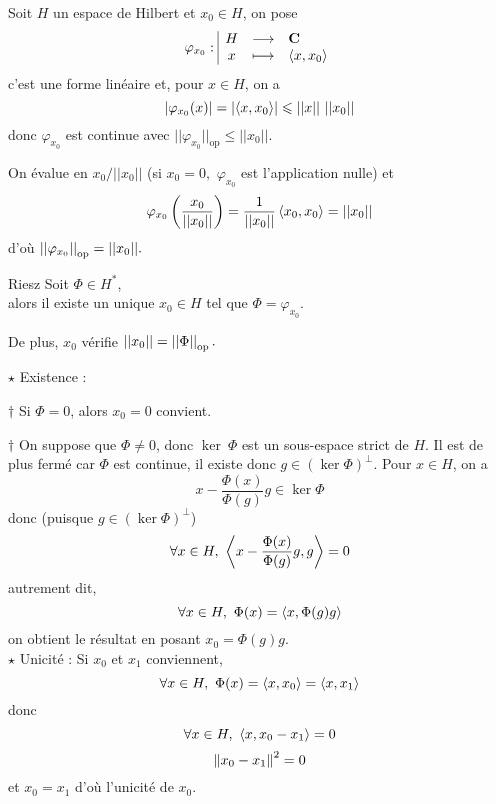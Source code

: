 \documentclass[a4paper,11pt, twoside]{article}
\begin{document}




Soit $H$ un espace de Hilbert et $x_0\in H$, on pose 
$$\varphi_{x_0}:\begin{array}{|ccl}
  H&\longrightarrow&\mathbf C\\
  x&\longmapsto&\left\langle x,x_0 \right\rangle
\end{array}$$
c'est une forme linéaire et, pour $x\in H$, on a 
$$\left| \varphi_{x_0}(x)\right|=\left| \left\langle x,x_0 \right\rangle\right|\leqslant ||x||\ ||x_0||$$
donc $\varphi_{x_0}$ est continue avec $||\varphi_{x_0}||_{\mathrm{op}}\leqslant ||x_0||.$

On évalue en $x_0/||x_0||$ (si $x_0=0,$ $\varphi_{x_0}$ est l'application nulle) et
$$\varphi_{x_0}\left(\frac{x_0}{||x_0||}\right)=\frac{1}{||x_0||}\left\langle x_0,x_0 \right\rangle=||x_0||$$
d'où $\left|\left|\varphi_{x_0}\right|\right|_{\mathrm{op}}=||x_0||.$


\begin{thC}{Riesz}
  Soit $\Phi\in H^*$,\\

   alors il existe un unique $x_0\in H$ tel que $\Phi=\varphi_{x_0}.$
\end{thC}


\begin{RQ}
  De plus, $x_0$ vérifie $||x_0||=\left|\left|\Phi\right|\right|_{\mathrm{op}}.$
\end{RQ}


\begin{Proof}
  $\star$ Existence :

  $\dagger$ Si $\Phi=0$, alors $x_0=0$ convient.

  $\dagger$ On suppose que $\Phi\neq0$, donc $\ker\ \Phi$ est un sous-espace strict de $H$. Il est de plus fermé car $\Phi$ est continue, il existe donc $g\in \left(\ker\Phi\right)^\bot.$
  Pour $x\in H$, on a 
  $$x-\frac{\Phi(x)}{\Phi(g)}g\in\ker\Phi$$
  donc (puisque $g\in \left(\ker\Phi\right)^\bot$)
  $$\forall x\in H,\ \ps{x-\frac{\Phi(x)}{\Phi(g)}g,g}=0$$
  autrement dit, 
  $$\forall x\in H,\ \Phi(x)=\left\langle x,\Phi(g)g \right\rangle$$
  on obtient le résultat en posant $x_0=\Phi(g)g$.\\

  $\star$ Unicité :
  Si $x_0$ et $x_1$ conviennent, 
  $$\forall x\in H,\ \Phi(x)=\ps{x,x_0}=\ps{x,x_1}$$
  donc 
  $$\forall x\in H,\ \left\langle x,x_0-x_1 \right\rangle=0$$
  $$\left\lVert x_0-x_1\right\rVert^2=0$$
  et $x_0=x_1$ d'où l'unicité de $x_0.$
\end{Proof}
\end{document}
